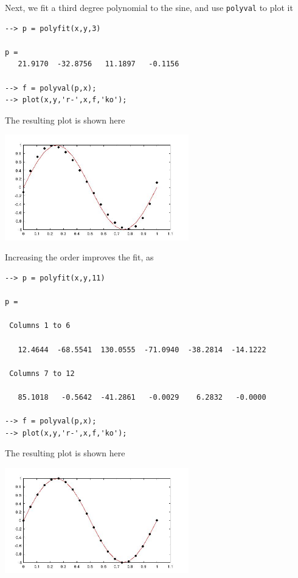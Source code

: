 Next, we fit a third degree polynomial to the sine, and use
\verb|polyval| to plot it
\begin{verbatim}
--> p = polyfit(x,y,3)

p = 
   21.9170  -32.8756   11.1897   -0.1156 

--> f = polyval(p,x);
--> plot(x,y,'r-',x,f,'ko');
\end{verbatim}
The resulting plot is shown here


\centerline{\includegraphics[width=8cm]{polyfit2}}

Increasing the order improves the fit, as
\begin{verbatim}
--> p = polyfit(x,y,11)

p = 

 Columns 1 to 6

   12.4644  -68.5541  130.0555  -71.0940  -38.2814  -14.1222 

 Columns 7 to 12

   85.1018   -0.5642  -41.2861   -0.0029    6.2832   -0.0000 

--> f = polyval(p,x);
--> plot(x,y,'r-',x,f,'ko');
\end{verbatim}
The resulting plot is shown here


\centerline{\includegraphics[width=8cm]{polyfit3}}

